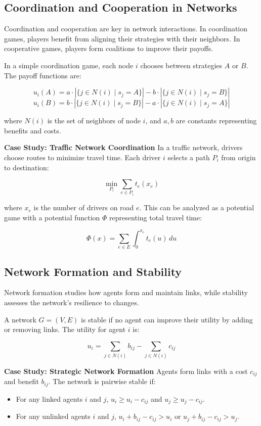 \documentclass[12pt]{book} %
\begin{document}
\subsection{Coordination and Cooperation in Networks}
Coordination and cooperation are key in network interactions. In coordination games, players benefit from aligning their strategies with their neighbors. In cooperative games, players form coalitions to improve their payoffs.

In a simple coordination game, each node $i$ chooses between strategies $A$ or $B$. The payoff functions are:

\[
u_i(A) = a \cdot \left|\{j \in N(i) \mid s_j = A\}\right| - b \cdot \left|\{j \in N(i) \mid s_j = B\}\right|
\]
\[
u_i(B) = b \cdot \left|\{j \in N(i) \mid s_j = B\}\right| - a \cdot \left|\{j \in N(i) \mid s_j = A\}\right|
\]

where $N(i)$ is the set of neighbors of node $i$, and $a, b$ are constants representing benefits and costs.

\textbf{Case Study: Traffic Network Coordination}
In a traffic network, drivers choose routes to minimize travel time. Each driver $i$ selects a path $P_i$ from origin to destination:

\[
\min_{P_i} \sum_{e \in P_i} t_e(x_e)
\]

where $x_e$ is the number of drivers on road $e$. This can be analyzed as a potential game with a potential function $\Phi$ representing total travel time:

\[
\Phi(x) = \sum_{e \in E} \int_0^{x_e} t_e(u) \, du
\]

\subsection{Network Formation and Stability}
Network formation studies how agents form and maintain links, while stability assesses the network's resilience to changes.

A network $G = (V, E)$ is stable if no agent can improve their utility by adding or removing links. The utility for agent $i$ is:

\[
u_i = \sum_{j \in N(i)} b_{ij} - \sum_{j \in N(i)} c_{ij}
\]

\textbf{Case Study: Strategic Network Formation}
Agents form links with a cost $c_{ij}$ and benefit $b_{ij}$. The network is pairwise stable if:

\begin{itemize}
    \item For any linked agents $i$ and $j$, $u_i \geq u_i - c_{ij}$ and $u_j \geq u_j - c_{ij}$.
    \item For any unlinked agents $i$ and $j$, $u_i + b_{ij} - c_{ij} > u_i$ or $u_j + b_{ij} - c_{ij} > u_j$.
\end{itemize}
\end{document}
